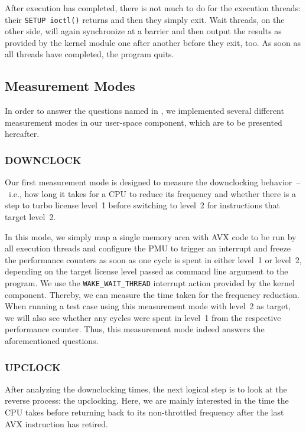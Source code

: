 After execution has completed, there is not much to do for the execution threads: their \texttt{SETUP ioctl()} returns and then they simply exit. Wait threads, on the other side, will again synchronize at a barrier and then output the results as provided by the kernel module one after another before they exit, too. As soon as all threads have completed, the program quits.

\subsection{Measurement Modes}
\label{sec:analysis:design:measurementmodes}

In order to answer the questions named in , we implemented several different measurement modes in our user-space component, which are to be presented hereafter.

\subsubsection{DOWNCLOCK}
\label{sec:analysis:design:measurementmodes:downclock}

Our first measurement mode is designed to measure the downclocking behavior~--~i.e., how long it takes for a \gls{CPU} to reduce its frequency and whether there is a step to turbo license level~1 before switching to level~2 for instructions that target level~2.

In this mode, we simply map a single memory area with \gls{AVX} code to be run by all execution threads and configure the \gls{PMU} to trigger an interrupt and freeze the performance counters as soon as one cycle is spent in either level~1 or level~2, depending on the target license level passed as command line argument to the program. We use the \texttt{WAKE\_WAIT\_THREAD} interrupt action provided by the kernel component. Thereby, we can measure the time taken for the frequency reduction. When running a test case using this measurement mode with level~2 as target, we will also see whether any cycles were spent in level~1 from the respective performance counter. Thus, this measurement mode indeed answers the aforementioned questions.

\subsubsection{UPCLOCK}
\label{sec:analysis:design:measurementmodes:upclock}

After analyzing the downclocking times, the next logical step is to look at the reverse process: the upclocking. Here, we are mainly interested in the time the \gls{CPU} takes before returning back to its non-throttled frequency after the last \gls{AVX} instruction has retired.

